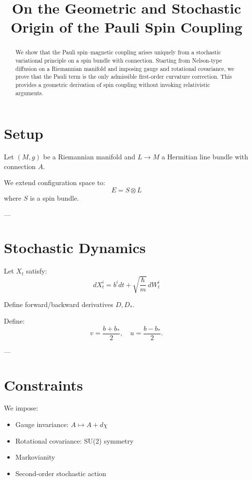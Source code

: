 \documentclass[11pt]{article}
\title{\textbf{On the Geometric and Stochastic Origin of the Pauli Spin Coupling}}
\author{}
\date{}
\begin{document}
\maketitle

\begin{abstract}
We show that the Pauli spin–magnetic coupling arises uniquely from a stochastic variational principle on a spin bundle with connection. Starting from Nelson-type diffusion on a Riemannian manifold and imposing gauge and rotational covariance, we prove that the Pauli term is the only admissible first-order curvature correction. This provides a geometric derivation of spin coupling without invoking relativistic arguments.
\end{abstract}

\section{Setup}

Let $(M,g)$ be a Riemannian manifold and $L \to M$ a Hermitian line bundle with connection $A$.

We extend configuration space to:
\[
E = S \otimes L
\]
where $S$ is a spin bundle.

---

\section{Stochastic Dynamics}

Let $X_t$ satisfy:
\[
dX_t^i = b^i dt + \sqrt{\frac{\hbar}{m}}\, dW_t^i
\]

Define forward/backward derivatives $D, D_*$.

Define:
\[
v = \frac{b+b_*}{2}, \quad u = \frac{b-b_*}{2}.
\]

---

\section{Constraints}

We impose:

\begin{itemize}
\item Gauge invariance: $A \mapsto A + d\chi$
\item Rotational covariance: SU(2) symmetry
\item Markovianity
\item Second-order stochastic action
\end{itemize}
\end{document}
